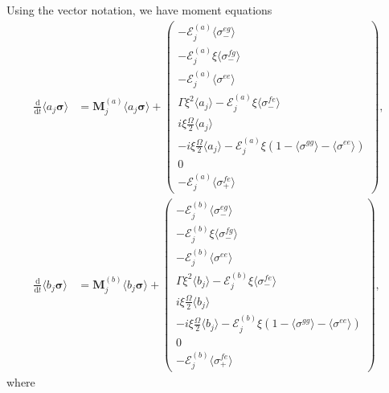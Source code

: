 \documentclass{article}
\newcommand{\ddt}[1][]{\frac{\mathrm{d} #1}{\mathrm{d}t}}
\begin{document}
Using the vector notation, we have moment equations
\begin{subequations}
	\begin{align}
		\ddt \langle a_{j} \bm{\sigma} \rangle &= \bm{M}_{j}^{(a)} \langle a_{j} \bm{\sigma} \rangle +
		\begin{pmatrix}
			-\mathcal{E}_{j}^{(a)} \langle \sigma^{eg}_{-} \rangle \\
			-\mathcal{E}_{j}^{(a)} \xi \langle \sigma^{fg}_{-} \rangle \\
			-\mathcal{E}_{j}^{(a)} \langle \sigma^{ee} \rangle \\
			\Gamma \xi^{2} \langle a_{j} \rangle -\mathcal{E}_{j}^{(a)} \xi \langle \sigma^{fe}_{-} \rangle \\
			i \xi \frac{\Omega}{2} \langle a_{j} \rangle \\
			-i \xi \frac{\Omega}{2} \langle a_{j} \rangle -\mathcal{E}_{j}^{(a)} \xi \left( 1 - \langle \sigma^{gg} \rangle - \langle \sigma^{ee} \rangle \right) \\
			0 \\
			-\mathcal{E}_{j}^{(a)} \langle \sigma^{fe}_{+} \rangle
		\end{pmatrix}, \\
		\ddt \langle b_{j} \bm{\sigma} \rangle &= \bm{M}_{j}^{(b)} \langle b_{j} \bm{\sigma} \rangle +
		\begin{pmatrix}
			-\mathcal{E}_{j}^{(b)} \langle \sigma^{eg}_{-} \rangle \\
			-\mathcal{E}_{j}^{(b)} \xi \langle \sigma^{fg}_{-} \rangle \\
			-\mathcal{E}_{j}^{(b)} \langle \sigma^{ee} \rangle \\
			\Gamma \xi^{2} \langle b_{j} \rangle -\mathcal{E}_{j}^{(b)} \xi \langle \sigma^{fe}_{-} \rangle \\
			i \xi \frac{\Omega}{2} \langle b_{j} \rangle \\
			-i \xi \frac{\Omega}{2} \langle b_{j} \rangle -\mathcal{E}_{j}^{(b)} \xi \left( 1 - \langle \sigma^{gg} \rangle - \langle \sigma^{ee} \rangle \right) \\
			0 \\
			-\mathcal{E}_{j}^{(b)} \langle \sigma^{fe}_{+} \rangle
		\end{pmatrix},
	\end{align}
\end{subequations}
where
\end{document}
